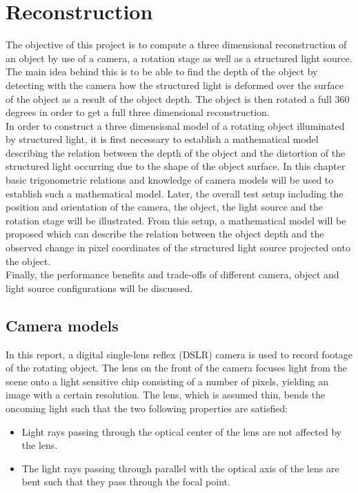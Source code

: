 \section{Reconstruction}
\label{sec:reconstructionmath}
The objective of this project is to compute a three dimensional reconstruction of an object by use of a camera, a rotation stage as well as a structured light source. The main idea behind this is to be able to find the depth of the object by detecting with the camera how the structured light is deformed over the surface of the object as a result of the object depth. The object is then rotated a full 360 degrees in order to get a full three dimensional reconstruction.\\

In order to construct a three dimensional model of a rotating object illuminated by structured light, it is first necessary to establish a mathematical model describing the relation between the depth of the object and the distortion of the structured light occurring due to the shape of the object surface. In this chapter basic trigonometric relations and knowledge of camera models will be used to establish such a mathematical model. Later, the overall test setup including the position and orientation of the camera, the object, the light source and the rotation stage will be illustrated. From this setup, a mathematical model will be proposed which can describe the relation between the object depth and the observed change in pixel coordinates of the structured light source projected onto the object.\\

Finally, the performance benefits and trade-offs of different camera, object and light source configurations will be discussed.  

\subsection{Camera models} \label{reconstruction:cameramodels}

In this report, a digital single-lens reflex (DSLR) camera is used to record footage of the rotating object. The lens on the front of the camera focuses light from the scene onto a light sensitive chip consisting of a number of pixels, yielding an image with a certain resolution. The lens, which is assumed thin, bends the oncoming light such that the two following properties are satisfied:

\begin{itemize}
    \item Light rays passing through the optical center of the lens are not affected by the lens.
    \item The light rays passing through parallel with the optical axis of the lens are bent such that they pass through the focal point.
\end{itemize}

